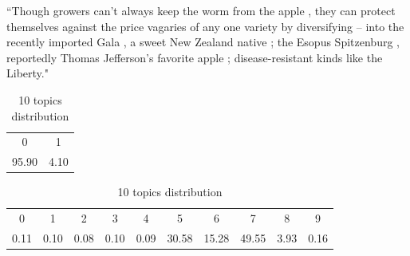 ``Though growers can't always keep the worm from the apple , they can protect themselves against the price vagaries of any one variety by diversifying -- into the recently imported Gala , a sweet New Zealand native ; the Esopus Spitzenburg , reportedly Thomas Jefferson's favorite apple ; disease-resistant kinds like the Liberty."
 
\begin{table}[!htb]
\centering

\caption{2 topics distribution}
\begin{tabular}{cc}
\\ \hline
0 & 1 \\
95.90 & 4.10 \\ \hline
\end{tabular}
\label{tab:2topicssent}

\caption{10 topics distribution
}
\begin{tabular}{cccccccccc}
\\ \hline

0 & \multicolumn{1}{c}{1} & \multicolumn{1}{c}{2} & \multicolumn{1}{c}{3} & \multicolumn{1}{c}{4} & \multicolumn{1}{c}{5} & \multicolumn{1}{c}{6} & \multicolumn{1}{c}{7} & \multicolumn{1}{c}{8} & \multicolumn{1}{c}{9} \\
0.11 & 0.10 & 0.08 & 0.10 & 0.09 & 30.58 & 15.28 & 49.55 & 3.93 & 0.16 \\ \hline
\end{tabular}
\label{tab:10topicssent}

\end{table}

